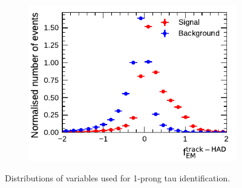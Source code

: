 \begin{figure}[htbp]
\begin{subfigure}{0.5\textwidth}
  \end{subfigure}%
  \begin{subfigure}{0.5\textwidth}
    \centering
    \includegraphics{./figures/baseline_bdt_vars/1p/ChPiEMEOverCaloEME.pdf}
  \end{subfigure}
  \caption[Distributions of variables used for 1-prong tau
  identification]{Distributions of variables used for 1-prong tau
    identification.}
  \label{fig:bdt_vars_1p_overlays}
\end{figure}

